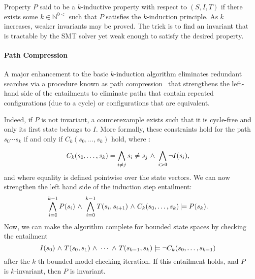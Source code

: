 Property $P$ said to be a $k$-inductive property with respect to
$(S,I,T)$ if there exists some $k \in \mathbb{N}^{0<}$ such that $P$
satisfies the $k$-induction principle. As $k$ increases, weaker
invariants may be proved.  The trick is to find an invariant that is
tractable by the SMT solver yet weak enough to satisfy the desired
property.  

\paragraph{Path Compression}  A major enhancement to the basic
$k$-induction 
algorithm eliminates redundant searches via a procedure
known as path compression~\cite{dMRS03} that strengthens the left-hand
side of the entailments to eliminate paths that contain repeated configurations  (due to
a cycle) or configurations that are equivalent.  


Indeed, if $P$ is not invariant, a
counterexample exists such that it is cycle-free and only its first state belongs to $I$. More formally, these constraints hold for the path $s_0 \cdots s_k$ if and only if  $C_k(s_0,\ldots,s_k)$ hold, where :

$$C_k(s_0,\ldots,s_k) = \bigwedge_{i \neq j} s_i \neq s_j  {\ \wedge \ }
\bigwedge_{i > 0} {\neg} I(s_i),$$
and where equality is defined  pointwise over the state vectors.
We can now strengthen the left hand side of the induction step
entailment:
$$\bigwedge^{k-1}_{i=0} P(s_i) {\ \wedge \ } \bigwedge ^{k-1}_{i=0}
T(s_i,s_{i+1}) {\ \wedge \ } C_k(s_0, \ldots, s_k) \models P(s_k). $$
Now, we can make the algorithm complete for bounded state spaces by
checking the entailment 
$$I(s_0) {\ \wedge \ } T(s_0,s_1) {\ \wedge \ } \cdots {\ \wedge \ } T(s_{k-1}, s_{k})
 \models {\neg} C_k(s_0,\ldots, s_{k-1})$$
after the $k$-th bounded model checking iteration.  If this entailment
holds, and $P$ is $k$-invariant, then $P$ is invariant. 

